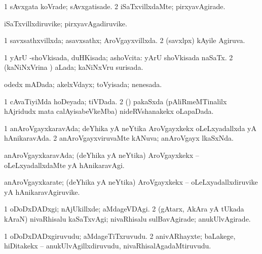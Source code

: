 {{\bentry
{} 
\gl{\kirxvi}
\expl{}
\bmng
\bnum
\num{1} sAvxgata koVrade; sAvxgatisade. 
\num{2} iSaTxvillxdaMte; pirxyavAgirade. 
\enum
\emng
\eentry

\bentry
{} 
\gl{\nA}
\expl{}
\bmng
iSaTxvillxdiruvike; pirxyavAgadiruvike. 
\emng
\eentry

\bentry
{} 
\gl{\gu}
\expl{}
\bmng
\bnum
\num{1} savxsathxvillxda; asavxsathx; AroVgayxvillxda. 
\num{2} (savxlpx) kAyile Agiruva. 
\enum
\emng
\eentry

\bentry
{} 
\gl{\gu}
\expl{}
\bmng
\bnum
\num{1} yArU -shoVkisada, duHKisada; ashoVcita:  yArU shoVkisada naSaTx. 
\num{2} (kaNiNxVrina \vi) aLada; kaNiNxVru surisada. 
\enum
\emng
\eentry

\bentry
{} 
\gl{\gu}
\expl{}
\bmng
odedx mADada; akelxVdayx; toVyisada; nenesada. 
\emng
\eentry

\bentry
{} 
\gl{\gu}
\expl{}
\bmng
\bnum
\num{1} cAvaTiyiMda hoDeyada; tiVDada. 
\num{2} (\birx) pakaSxda (pAliRmeMTinalilx hAjridudx mata calAyisabeVkeMba) nideRVshanakekx oLapaDada. 
\enum
\emng
\eentry

\bentry
{} 
\gl{\gu}
\expl{}
\bmng
\bnum
\num{1} anAroVgayxkaravAda; deYhika yA neYtika AroVgayxkekx oLeLxyadallxda yA hAnikaravAda. 
\num{2} anAroVgayxviruvaMte kANuva; anAroVgayx lkaSxNda. 
\enum
\emng
\eentry

\bentry
{} 
\gl{\kirxvi}
\expl{}
\bmng
anAroVgayxkaravAda; (deYhika yA neYtika) AroVgayxkekx -- oLeLxyadallxdaMte yA hAnikaravAgi. 
\emng
\eentry

\bentry
{} 
\gl{\nA}
\expl{}
\bmng
anAroVgayxkarate; (deYhika yA neYtika) AroVgayxkekx -- oLeLxyadallxdiruvike yA hAnikaravAgiruvike. 
\emng
\eentry

\bentry
{} 
\gl{\kirxvi}
\expl{}
\bmng
\bnum
\num{1} oDoDxDADxgi; nAjUkillxde; aMdageVDAgi. 
\num{2} (gAtarx, AkAra yA tUkada kAraN) nivaRhisalu kaSaTxvAgi; nivaRhisalu sulBavAgirade; anukUlvAgirade. 
\enum
\emng
\eentry

\bentry
{} 
\gl{\nA}
\expl{}
\bmng
\bnum
\num{1} oDoDxDADxgiruvudu; aMdageTiTxruvudu. 
\num{2} anivARhayxte; baLakege, hiDitakekx -- anukUlvAgillxdiruvudu, nivaRhisalAgadaMtiruvudu. 
\enum
\emng
\eentry

}}
